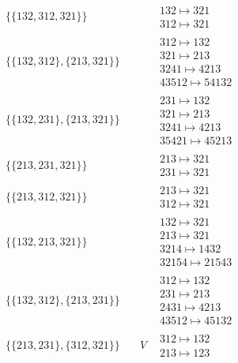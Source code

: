\begin{tiny}
\begin{align}
\begin{matrix}
\end{matrix}
\\
\{\{132, 312, 321\}\}
\quad
&
\phantom{.}
&
\begin{matrix}
132 \mapsto 321\\312 \mapsto 321
\end{matrix}
\\
\{\{132, 312\}, \{213, 321\}\}
\quad
&
\phantom{.}
&
\begin{matrix}
312 \mapsto 132\\321 \mapsto 213\\3241 \mapsto 4213\\43512 \mapsto 54132
\end{matrix}
\\
\{\{132, 231\}, \{213, 321\}\}
\quad
&
\phantom{.}
&
\begin{matrix}
231 \mapsto 132\\321 \mapsto 213\\3241 \mapsto 4213\\35421 \mapsto 45213
\end{matrix}
\\
\{\{213, 231, 321\}\}
\quad
&
\phantom{.}
&
\begin{matrix}
213 \mapsto 321\\231 \mapsto 321
\end{matrix}
\\
\{\{213, 312, 321\}\}
\quad
&
\phantom{.}
&
\begin{matrix}
213 \mapsto 321\\312 \mapsto 321
\end{matrix}
\\
\{\{132, 213, 321\}\}
\quad
&
\phantom{.}
&
\begin{matrix}
132 \mapsto 321\\213 \mapsto 321\\3214 \mapsto 1432\\32154 \mapsto 21543
\end{matrix}
\\
\{\{132, 312\}, \{213, 231\}\}
\quad
&
\phantom{.}
&
\begin{matrix}
312 \mapsto 132\\231 \mapsto 213\\2431 \mapsto 4213\\43512 \mapsto 45132
\end{matrix}
\\
\{\{213, 231\}, \{312, 321\}\}
\quad
&
V
&
\begin{matrix}
312 \mapsto 132\\213 \mapsto 123

\end{matrix}
\end{align}
\end{tiny}

